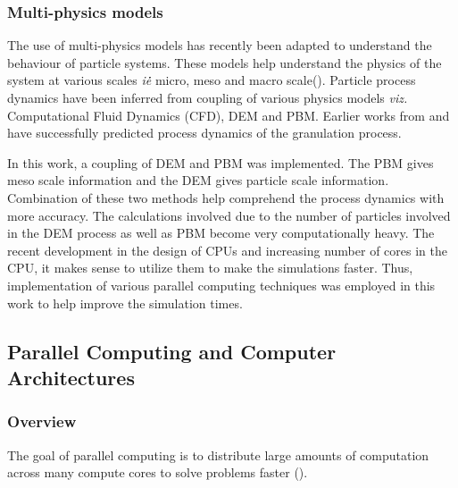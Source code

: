 \documentclass[preprint,11pt,authoryear]{elsarticle}
\begin{document}
	    \subsubsection{Multi-physics models}
		\par The use of multi-physics models has recently been adapted to understand the behaviour of particle systems. These models help understand the physics of the system at various scales \textit{i\.e\.} micro, meso and macro scale(\cite{sen2014}). Particle process dynamics have been inferred from coupling of various physics models \textit{viz.} Computational Fluid Dynamics (CFD), DEM and PBM. Earlier works from \cite{sen2014} and \cite{Barrasso2015cerd} have successfully predicted process dynamics of the granulation process.
		\par In this work, a coupling of DEM and PBM was implemented. The PBM gives meso scale information and the DEM gives particle scale information. Combination of these two methods help comprehend the process dynamics with more accuracy. The calculations involved due to the number of particles involved in the DEM process as well as PBM become very computationally heavy. The recent development in the design of CPUs and increasing number of cores in the CPU, it makes sense to utilize them to make the simulations faster. Thus, implementation of various parallel computing techniques was employed in this work to help improve the simulation times.  
	
	
	  \subsection{Parallel Computing and Computer Architectures}
	    \subsubsection{Overview}
	    \par The goal of parallel computing is to distribute large amounts of computation across many compute cores to solve problems faster (\cite{wilkinson2005}).
\end{document}

